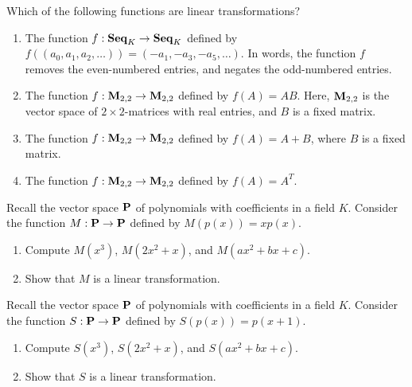 \begin{ex}
  Which of the following functions are linear transformations?
  \begin{enumerate}
  \item The function $f:\mathbf{Seq}_K\to\mathbf{Seq}_K$ defined by
    $f((a_0,a_1,a_2,\ldots)) = (-a_1,-a_3,-a_5,\ldots)$. In words, the
    function $f$ removes the even-numbered entries, and negates the
    odd-numbered entries.
  \item The function $f:\mathbf{M}_{2,2}\to\mathbf{M}_{2,2}$ defined by $f(A) =
    AB$. Here, $\mathbf{M}_{2,2}$ is the vector space of $2\times
    2$-matrices with real entries, and $B$ is a fixed matrix.
  \item The function $f:\mathbf{M}_{2,2}\to\mathbf{M}_{2,2}$ defined by $f(A) =
    A+B$, where $B$ is a fixed matrix.
  \item The function $f:\mathbf{M}_{2,2}\to\mathbf{M}_{2,2}$ defined by $f(A) =
    A^T$.
  \end{enumerate}
\end{ex}

\begin{ex}
  Recall the vector space $\mathbf{P}$ of polynomials with coefficients in
  a field $K$. Consider the function $M:\mathbf{P}\to\mathbf{P}$ defined by
  $M(p(x)) = xp(x)$.
  \begin{enumerate}
  \item Compute $M(x^3)$, $M(2x^2+x)$, and $M(ax^2+bx+c)$.
  \item Show that $M$ is a linear transformation.
  \end{enumerate}
\end{ex}

\begin{ex}
  Recall the vector space $\mathbf{P}$ of polynomials with coefficients in
  a field $K$. Consider the function $S:\mathbf{P}\to\mathbf{P}$ defined by
  $S(p(x)) = p(x+1)$.
  \begin{enumerate}
  \item Compute $S(x^3)$, $S(2x^2+x)$, and $S(ax^2+bx+c)$.
  \item Show that $S$ is a linear transformation.
  \end{enumerate}
\end{ex}

